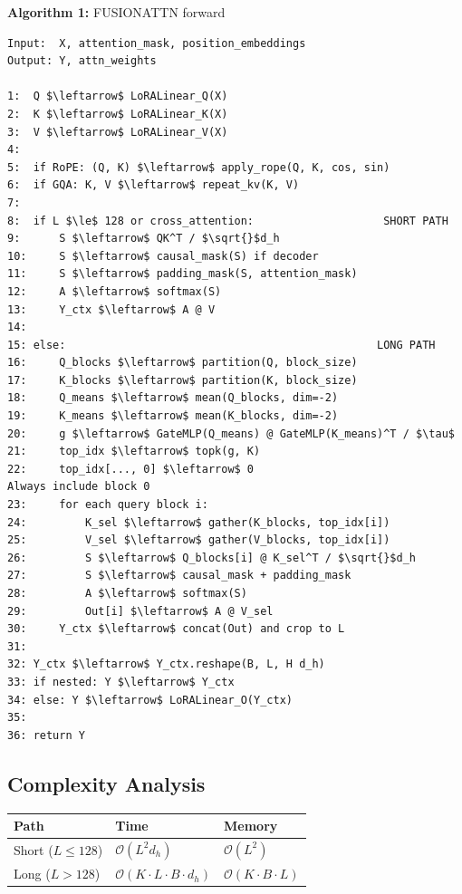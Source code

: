 \textbf{Algorithm 1:} FUSIONATTN forward
\begin{lstlisting}
Input:  X, attention_mask, position_embeddings
Output: Y, attn_weights

1:  Q $\leftarrow$ LoRALinear_Q(X)
2:  K $\leftarrow$ LoRALinear_K(X)
3:  V $\leftarrow$ LoRALinear_V(X)
4:
5:  if RoPE: (Q, K) $\leftarrow$ apply_rope(Q, K, cos, sin)
6:  if GQA: K, V $\leftarrow$ repeat_kv(K, V)
7:
8:  if L $\le$ 128 or cross_attention:                    SHORT PATH
9:      S $\leftarrow$ QK^T / $\sqrt{}$d_h
10:     S $\leftarrow$ causal_mask(S) if decoder
11:     S $\leftarrow$ padding_mask(S, attention_mask)
12:     A $\leftarrow$ softmax(S)
13:     Y_ctx $\leftarrow$ A @ V
14:
15: else:                                                LONG PATH
16:     Q_blocks $\leftarrow$ partition(Q, block_size)
17:     K_blocks $\leftarrow$ partition(K, block_size)
18:     Q_means $\leftarrow$ mean(Q_blocks, dim=-2)
19:     K_means $\leftarrow$ mean(K_blocks, dim=-2)
20:     g $\leftarrow$ GateMLP(Q_means) @ GateMLP(K_means)^T / $\tau$
21:     top_idx $\leftarrow$ topk(g, K)
22:     top_idx[..., 0] $\leftarrow$ 0                            Always include block 0
23:     for each query block i:
24:         K_sel $\leftarrow$ gather(K_blocks, top_idx[i])
25:         V_sel $\leftarrow$ gather(V_blocks, top_idx[i])
26:         S $\leftarrow$ Q_blocks[i] @ K_sel^T / $\sqrt{}$d_h
27:         S $\leftarrow$ causal_mask + padding_mask
28:         A $\leftarrow$ softmax(S)
29:         Out[i] $\leftarrow$ A @ V_sel
30:     Y_ctx $\leftarrow$ concat(Out) and crop to L
31:
32: Y_ctx $\leftarrow$ Y_ctx.reshape(B, L, H d_h)
33: if nested: Y $\leftarrow$ Y_ctx
34: else: Y $\leftarrow$ LoRALinear_O(Y_ctx)
35:
36: return Y
\end{lstlisting}

\subsection{Complexity Analysis}

\begin{table}[H]
\centering
\small
\begin{tabular}{lll}
\toprule
\textbf{Path} & \textbf{Time} & \textbf{Memory} \\
\midrule
Short ($L \leq 128$) & $\mathcal{O}(L^2 d_h)$ & $\mathcal{O}(L^2)$ \\
Long ($L > 128$) & $\mathcal{O}(K \cdot L \cdot B \cdot d_h)$ & $\mathcal{O}(K \cdot B \cdot L)$ \\
\bottomrule
\end{tabular}
\end{table}

